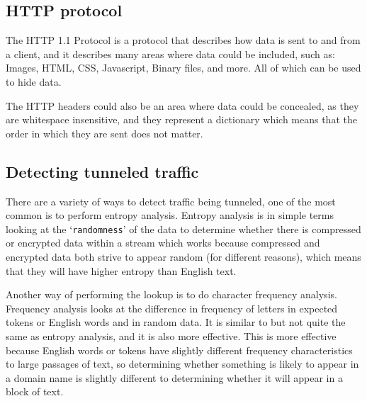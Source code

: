 \subsection{HTTP protocol}
The HTTP 1.1 Protocol\cite{rfc2616} is a protocol that describes how data is sent to and from a client, and it describes many areas where data could be included, such as:
Images,
HTML,
CSS,
Javascript,
Binary files,
and more.
All of which can be used to hide data.\par
The HTTP headers could also be an area where data could be concealed, as they are whitespace insensitive, and they represent a dictionary which means that the order in which they are sent does not matter.

\subsection{Detecting tunneled traffic}
There are a variety of ways to detect traffic being tunneled, one of the most common is to perform entropy analysis\cite{detectingdns}.
Entropy analysis is in simple terms looking at the `\texttt{randomness}' of the data to determine whether there is compressed or encrypted data within a stream which works because compressed and encrypted data both strive to appear random (for different reasons), which means that they will have higher entropy than English text.\par
Another way of performing the lookup is to do character frequency analysis\cite{freqanal}.
Frequency analysis looks at the difference in frequency of letters in expected tokens or English words and in random data. It is similar to but not quite the same as entropy analysis, and it is also more effective.
This is more effective because English words or tokens have slightly different frequency characteristics to large passages of text, so determining whether something is likely to appear in a domain name is slightly different to determining whether it will appear in a block of text.

